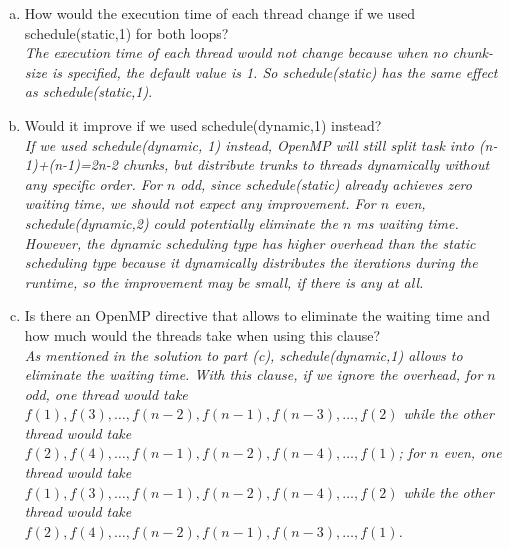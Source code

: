 \documentclass{article}
\begin{document}
\begin{enumerate}
\begin{enumerate}[(a)]
    \item How would the execution time of each thread change if we used schedule(static,1) for
both loops?
\\\textit{The execution time of each thread would not change because when no chunk-size is specified, the default value is 1. So schedule(static) has the same effect as schedule(static,1)}.

\item Would it improve if we used schedule(dynamic,1) instead?
\\\textit{If we used schedule(dynamic, 1) instead,
OpenMP will still split task into (n-1)+(n-1)=2n-2 chunks, but distribute trunks to threads dynamically without any specific order. For $n$ odd, since schedule(static) already achieves zero waiting time, we should not expect any improvement. For $n$ even, schedule(dynamic,2) could potentially eliminate the $n$ ms waiting time. However, the dynamic scheduling type has higher overhead than the static scheduling type because it dynamically distributes the iterations during the runtime, so the improvement may be small, if there is any at all.} 

\item Is there an OpenMP directive that allows to eliminate the waiting time and how much would
the threads take when using this clause?
\\\textit{As mentioned in the solution to part (c), schedule(dynamic,1) allows to eliminate the waiting time. With this clause, if we ignore the overhead, for $n$ odd, one thread would take $f(1), f(3), \ldots, f(n-2), f(n-1), f(n-3), \ldots, f(2)$ while the other thread would take $f(2), f(4), \ldots, f(n-1), f(n-2),f(n-4),\ldots, f(1)$; for $n$ even, one thread would take $f(1), f(3), \ldots, f(n-1), f(n-2), f(n-4), \ldots, f(2)$ while the other thread would take $f(2), f(4), \ldots, f(n-2), f(n-1),f(n-3),\ldots, f(1)$.}
\end{enumerate}


\end{enumerate}
\end{document}
